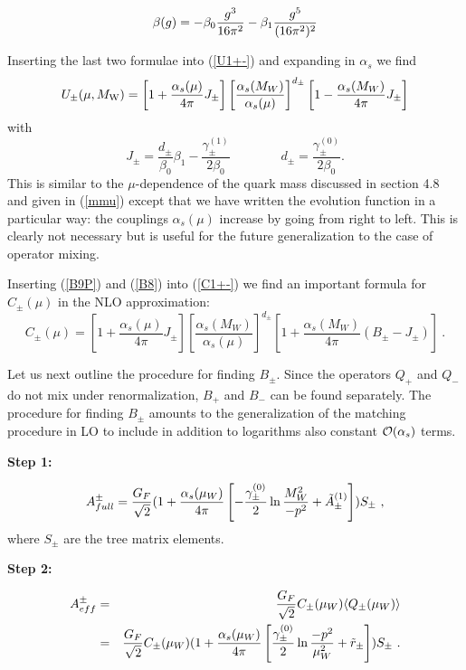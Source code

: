 \documentclass[12pt,rotate]{article}
\def\as{\alpha_s}
\newcommand{\mw}{M_{\rm W}}
\newcommand{\ord}{{\cal O}}
\begin{document}
\begin{itemize}
\begin{itemize}
\begin{itemize}
\begin{equation}\label{bg01P}
\beta(g)=-\beta_0{g^3\over 16\pi^2}-\beta_1{g^5\over (16\pi^2)^2}
  \end{equation}

Inserting the last two formulae into (\ref{U1+-}) and expanding in
$\alpha_s$ we find
\begin{equation}\label{B9P}
U_\pm(\mu,\mw)=\left[1+\frac{\as(\mu)}{4\pi}J_\pm\right]
      \left[\frac{\as(M_W)}{\as(\mu)}\right]^{d_\pm}
\left[1-\frac{\as(M_W)}{4\pi} J_\pm\right]
\end{equation}
with
\begin{equation}\label{B10P}
J_\pm=\frac{d_\pm}{\beta_0}\beta_1-\frac{\gamma^{(1)}_\pm}{2\beta_0}
\qquad\qquad
d_\pm=\frac{\gamma^{(0)}_\pm}{2\beta_0}.
\end{equation}
This is similar to the $\mu$-dependence of the quark mass discussed
in section 4.8 and given in (\ref{mmu}) except that we have 
written the evolution function
in a particular way: the couplings $\as(\mu)$ increase by going from
right to left. This is clearly not necessary but is useful for the
future generalization to the case of operator mixing.

Inserting (\ref{B9P}) and (\ref{B8}) into (\ref{C1+-}) we find
an important formula for $C_\pm(\mu)$ in the NLO approximation:
\begin{equation}\label{B9PP}
C_\pm(\mu)=\left[1+\frac{\as(\mu)}{4\pi}J_\pm\right]
      \left[\frac{\as(M_W)}{\as(\mu)}\right]^{d_\pm}
\left[1+\frac{\as(M_W)}{4\pi}(B_\pm-J_\pm)\right]~.
\end{equation}

Let us next outline the procedure for finding $B_\pm$.
Since the operators $Q_+$ and $Q_-$ do not mix under renormalization,
$B_+$ and $B_-$ can be found separately. 
The procedure for finding $B_\pm$ amounts to the generalization of
the matching procedure in
LO to include in addition to logarithms also
constant $\ord (\as)$ terms.

{\bf Step 1:}

\begin{equation}\label{amp2}
A^\pm_{full} =
{G_F\over\sqrt{2}}(1+{\as(\mu_W)\over 4\pi}\left[-{{\gamma^{(0)}_\pm}\over 2}
\ln{M^2_W\over -p^2}+\tilde A^{(1)}_\pm\right]) S_\pm~,  \end{equation}
where $S_\pm$ are the tree matrix elements.

{\bf Step 2:}

\vspace{-0.41truecm}
\begin{eqnarray}\label{aef2}
A^\pm_{eff}&=&{G_F\over\sqrt{2}}C_\pm (\mu_W)\langle Q_\pm(\mu_W)\rangle \\
&=&{G_F\over\sqrt{2}}C_\pm(\mu_W)
(1+{\as(\mu_W)\over 4\pi}\left[{{\gamma^{(0)}_\pm}\over 2}
 \ln{-p^2\over\mu^2_W}+\tilde r_\pm
 \right])S_\pm~.   \nonumber
\end{eqnarray}


\end{itemize}
\end{itemize}
\end{itemize}
\end{document}
